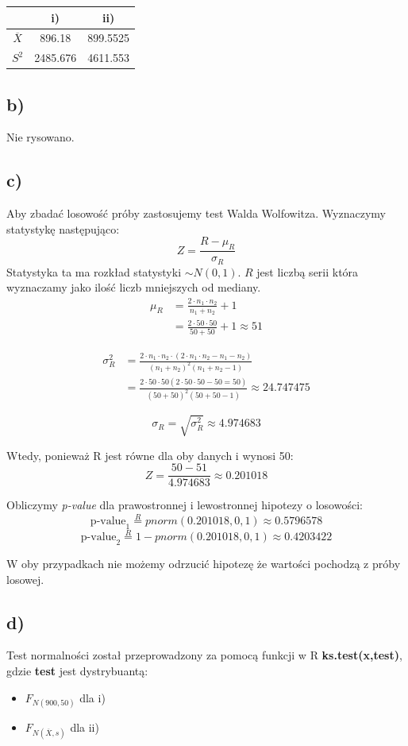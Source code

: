 \documentclass{article}
\begin{document}
\begin{center} \begin{tabular}{|c|c|c|} \hline
 & i) & ii) \\ \hline
$\overline{X}$ & 896.18 & 899.5525 \\ \hline
$S^2$ & 2485.676 & 4611.553 \\ \hline
\end{tabular} \end{center}

\subsection{b)}
Nie rysowano.

\subsection{c)}
Aby zbadać losowość próby zastosujemy test Walda Wolfowitza. Wyznaczymy statystykę następująco:
\[ Z = \frac{R - \mu_R}{\sigma_R} \]
Statystyka ta ma rozkład statystyki $\sim N(0,1)$. $R$ jest liczbą serii która wyznaczamy jako ilość liczb mniejszych od mediany.
\begin{align*}
\mu_R &= \frac{2 \cdot n_1 \cdot n_2}{n_1 + n_2} + 1 \\
& = \frac{2 \cdot 50 \cdot 50}{50 + 50} + 1 \approx 51 \end{align*}

\begin{align*}
\sigma^2_R & = \frac{2 \cdot n_1 \cdot n_2 \cdot (2 \cdot n_1 \cdot n_2 - n_1 - n_2)}{(n_1+n_2)^2(n_1 + n_2 - 1)} \\
& = \frac{2 \cdot 50 \cdot 50 (2 \cdot 50 \cdot 50 - 50 = 50)}{(50 + 50)^2(50 + 50 - 1)} \approx 24.747475 \end{align*}

\[ \sigma_R = \sqrt{\sigma^2_R} \approx 4.974683 \]

Wtedy, ponieważ R jest równe dla oby danych i wynosi 50:
\[ Z = \frac{50 - 51}{4.974683} \approx 0.201018 \]

Obliczymy \textit{p-value} dla prawostronnej i lewostronnej hipotezy o losowości:
\[ \text{p-value}_1 \overset{R}{=} pnorm(0.201018, 0, 1) \approx 0.5796578 \]
\[ \text{p-value}_2 \overset{R}{=} 1 - pnorm(0.201018, 0, 1) \approx 0.4203422 \]

W oby przypadkach nie możemy odrzucić hipotezę że wartości pochodzą z próby losowej.

\subsection{d)}
Test normalności został przeprowadzony za pomocą funkcji w R \textbf{ks.test(x,test)}, gdzie \textbf{test} jest dystrybuantą:
\begin{itemize}
\item $F_{N(900,50)}$ dla i)
\item $F_{N(\overline{X},s)}$ dla ii)
\end{itemize}
\end{document}

